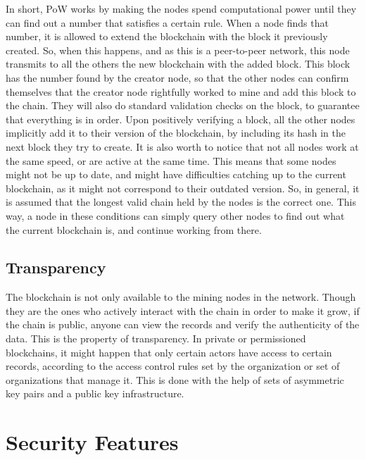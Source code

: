     In short, PoW works by making the nodes spend computational power until they can find out a number that satisfies a certain rule. %
    When a node finds that number, it is allowed to extend the blockchain with the block it previously created. So, when this happens, and as this is a peer-to-peer network, this node transmits to all the others the new blockchain with the added block. This block has the number found by the creator node, so that the other nodes can confirm themselves that the creator node rightfully worked to mine and add this block to the chain. They will also do standard validation checks on the block, to guarantee that everything is in order. Upon positively verifying a block, all the other nodes implicitly add it to their version of the blockchain, by including its hash in the next block they try to create. 
    It is also worth to notice that not all nodes work at the same speed, or are active at the same time. This means that some nodes might not be up to date, and might have difficulties catching up to the current blockchain, as it might not correspond to their outdated version. So, in general, it is assumed that the longest valid chain held by the nodes is the correct one. This way, a node in these conditions can simply query other nodes to find out what the current blockchain is, and continue working from there.
    
    \subsection{Transparency}
   The blockchain is not only available to the mining nodes in the network. Though they are the ones who actively interact with the chain in order to make it grow, if the chain is public, anyone can view the records and verify the authenticity of the data. This is the property of transparency. In private or permissioned blockchains, it might happen that only certain actors have access to certain records, according to the access control rules set by the organization or set of organizations that manage it. This is done with the help of sets of asymmetric key pairs and a public key infrastructure.
    
        
\section{Security Features}

